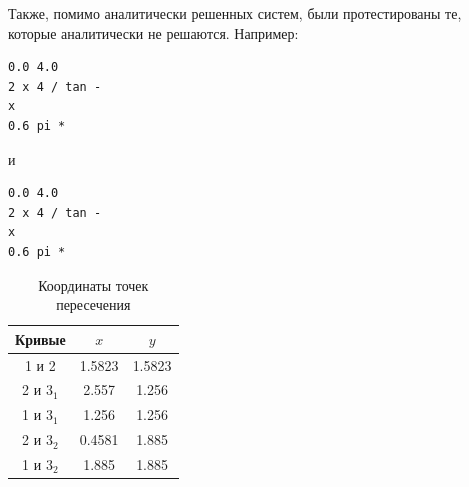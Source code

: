 \documentclass[a4paper,12pt,titlepage,finall]{article}
\begin{document}
\newpage
Также, помимо аналитически решенных систем, были протестированы те, которые аналитически не решаются. Например:
\begin{verbatim}
0.0 4.0
2 x 4 / tan -
x
0.6 pi *
\end{verbatim}
и
\begin{verbatim}
0.0 4.0
2 x 4 / tan -
x
0.6 pi *
\end{verbatim}
\begin{table}[h]
\centering
\begin{tabular}{|c|c|c|}
\hline
Кривые & $x$ & $y$ \\
\hline
1 и 2 &  1.5823 & 1.5823 \\
2 и $3_1$ &  2.557 & 1.256 \\
1 и $3_1$ & 1.256 & 1.256 \\
2 и $3_2$ &  0.4581 & 1.885 \\
1 и $3_2$ & 1.885 & 1.885 \\
\hline
\end{tabular}
\caption{Координаты точек пересечения}
\label{table1}
\end{table}
\end{document}
